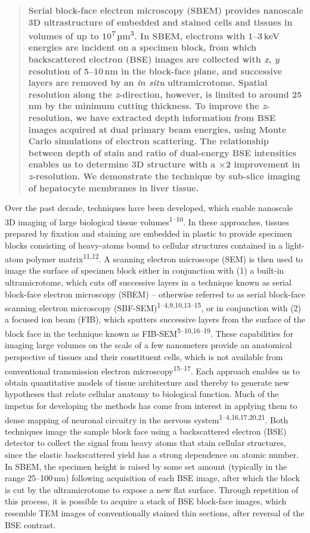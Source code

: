 \documentclass{article}
\newcommand{\cit}[1]{\textsuperscript{#1}}
\begin{document}
\begin{quote}
\textbf{Serial block-face electron microscopy (SBEM) provides nanoscale 3D ultrastructure of embedded and stained cells and tissues in volumes of up to 10\textsuperscript{7}\,µm\textsuperscript{3}. In SBEM, electrons with 1–3\,keV energies are incident on a specimen block, from which backscattered electron (BSE) images are collected with \emph{x}, \emph{y} resolution of 5–10\,nm in the block-face plane, and successive layers are removed by an \emph{in situ} ultramicrotome. Spatial resolution along the \emph{z}-direction, however, is limited to around 25\,nm by the minimum cutting thickness. To improve the \emph{z}-resolution, we have extracted depth information from BSE images acquired at dual primary beam energies, using Monte Carlo simulations of electron scattering. The relationship between depth of stain and ratio of dual-energy BSE intensities enables us to determine 3D structure with a ×2 improvement in \emph{z}-resolution. We demonstrate the technique by sub-slice imaging of hepatocyte membranes in liver tissue.}
\end{quote}

Over the past decade, techniques have been developed, which enable nanoscale 3D imaging of large biological tissue volumes\cit{1–10}. In these approaches, tissues prepared by fixation and staining are embedded in plastic to provide specimen blocks consisting of heavy-atoms bound to cellular structures contained in a light-atom polymer matrix\cit{11,12}. A scanning electron microscope (SEM) is then used to image the surface of specimen block either in conjunction with (1) a built-in ultramicrotome, which cuts off successive layers in a technique known as serial block-face electron microscopy (SBEM) – otherwise referred to as serial block-face scanning electron microscopy (SBF-SEM)\cit{1–4,9,10,13–15}, or in conjunction with (2) a focused ion beam (FIB), which sputters successive layers from the surface of the block face in the technique known as FIB-SEM\cit{5–10,16–19}. These capabilities for imaging large volumes on the scale of a few nanometers provide an anatomical perspective of tissues and their constituent cells, which is not available from conventional transmission electron microscopy\cit{15–17}. Each approach enables us to obtain quantitative models of tissue architecture and thereby to generate new hypotheses that relate cellular anatomy to biological function. Much of the impetus for developing the methods has come from interest in applying them to dense mapping of neuronal circuitry in the nervous system\cit{1–4,16,17,20,21}. Both techniques image the sample block face using a backscattered electron (BSE) detector to collect the signal from heavy atoms that stain cellular structures, since the elastic backscattered yield has a strong dependence on atomic number. In SBEM, the specimen height is raised by some set amount (typically in the range 25–100\,nm) following acquisition of each BSE image, after which the block is cut by the ultramicrotome to expose a new flat surface. Through repetition of this process, it is possible to acquire a stack of BSE block-face images, which resemble TEM images of conventionally stained thin sections, after reversal of the BSE contrast.
\end{document}
